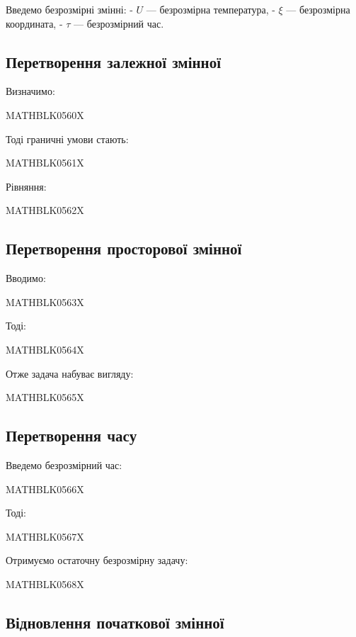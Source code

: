 \documentclass[
  ukrainian,
]{article}
\begin{document}
Введемо безрозмірні змінні: - \(U\) --- безрозмірна температура, -
\(\xi\) --- безрозмірна координата, - \(\tau\) --- безрозмірний час.

\subsection{Перетворення залежної
змінної}\label{ux43fux435ux440ux435ux442ux432ux43eux440ux435ux43dux43dux44f-ux437ux430ux43bux435ux436ux43dux43eux457-ux437ux43cux456ux43dux43dux43eux457}

Визначимо:

MATHBLK0560X

Тоді граничні умови стають:

MATHBLK0561X

Рівняння:

MATHBLK0562X

\subsection{Перетворення просторової
змінної}\label{ux43fux435ux440ux435ux442ux432ux43eux440ux435ux43dux43dux44f-ux43fux440ux43eux441ux442ux43eux440ux43eux432ux43eux457-ux437ux43cux456ux43dux43dux43eux457}

Вводимо:

MATHBLK0563X

Тоді:

MATHBLK0564X

Отже задача набуває вигляду:

MATHBLK0565X

\subsection{Перетворення
часу}\label{ux43fux435ux440ux435ux442ux432ux43eux440ux435ux43dux43dux44f-ux447ux430ux441ux443}

Введемо безрозмірний час:

MATHBLK0566X

Тоді:

MATHBLK0567X

Отримуємо остаточну безрозмірну задачу:

MATHBLK0568X

\subsection{Відновлення початкової
змінної}\label{ux432ux456ux434ux43dux43eux432ux43bux435ux43dux43dux44f-ux43fux43eux447ux430ux442ux43aux43eux432ux43eux457-ux437ux43cux456ux43dux43dux43eux457}
\end{document}
